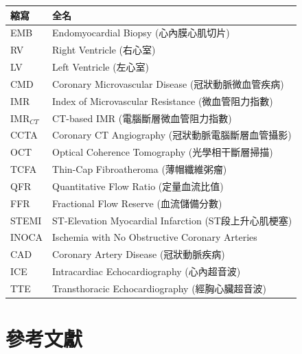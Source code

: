 \documentclass[12pt,a4paper]{article}
\begin{document}
\begin{longtable}{p{4cm}p{10cm}}
\toprule
\textbf{縮寫} & \textbf{全名} \\
\midrule
\endfirsthead
\bottomrule
\endfoot

EMB & Endomyocardial Biopsy (心內膜心肌切片) \\
RV & Right Ventricle (右心室) \\
LV & Left Ventricle (左心室) \\
CMD & Coronary Microvascular Disease (冠狀動脈微血管疾病) \\
IMR & Index of Microvascular Resistance (微血管阻力指數) \\
IMR$_{CT}$ & CT-based IMR (電腦斷層微血管阻力指數) \\
CCTA & Coronary CT Angiography (冠狀動脈電腦斷層血管攝影) \\
OCT & Optical Coherence Tomography (光學相干斷層掃描) \\
TCFA & Thin-Cap Fibroatheroma (薄帽纖維粥瘤) \\
QFR & Quantitative Flow Ratio (定量血流比值) \\
FFR & Fractional Flow Reserve (血流儲備分數) \\
STEMI & ST-Elevation Myocardial Infarction (ST段上升心肌梗塞) \\
INOCA & Ischemia with No Obstructive Coronary Arteries \\
CAD & Coronary Artery Disease (冠狀動脈疾病) \\
ICE & Intracardiac Echocardiography (心內超音波) \\
TTE & Transthoracic Echocardiography (經胸心臟超音波) \\
\bottomrule
\end{longtable}

\section{參考文獻}
\end{document}
